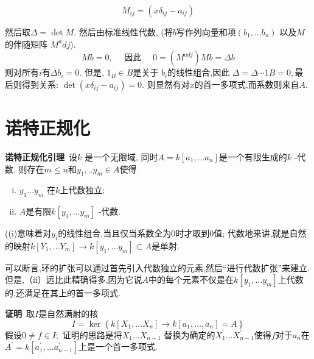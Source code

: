 \documentclass[UTF8]{book}
\begin{document}
		\begin{equation*}
		M _{ i j }=\left(x \delta_{ i j }- a _{ i j }\right)
		\end{equation*}
		
		然后取$\Delta=\operatorname{det} M .$ 然后由标准线性代数, (将$b$写作列向量和项$\left(b_{1}, \dots b_{n}\right)$ 以及$M$的伴随矩阵 $M^adj$).
		\begin{equation*}
		Mb =0, \quad \text { 因此 } \quad 0=\left(M ^{ adj }\right) Mb =\Delta b
		\end{equation*}
		则对所有$ i $有$\Delta b_{i}=0$. 但是, $1_{B} \in B$是关于 $b _{ i }$的线性组合,因此 $\Delta=\Delta \cdots 1 B =0,$最后则得到关系: $\operatorname{det}\left(x \delta_{ ij }- a _{ ij }\right)=0 .$ 则显然有对$x$的首一多项式,而系数则来自$ A $.
		
		
	\section{诺特正规化}
		\textbf{诺特正规化引理}\ 设$k$ 是一个无限域, 同时$A=k\left[a_{1}, \ldots a_{n}\right]$是一个有限生成的$k$ -代数. 则存在$m \leq n$和$y_{1}, . . y_{m} \in A$使得
		\begin{enumerate}[(i)]
			\item  $y _{1} \ldots y _{ m }$ 在$k$上代数独立;
			\item $A$是有限$k \left[ y _{1}, \dots y _{ m }\right]$ -代数.
		\end{enumerate}
		
		
		((i)意味着对$y_{i}$的线性组合,当且仅当系数全为0时才取到0值; 代数地来讲,就是自然的映射$k \left[ Y _{1}, \ldots Y _{ m }\right] \rightarrow k \left[ y _{1}, \ldots y _{ m }\right] \subset A$是单射.
		
		可以断言,环的扩张可以通过首先引入代数独立的元素,然后“进行代数扩张”来建立.但是,（ii）远比此精确得多,因为它说$ A $中的每个元素不仅是在$ k \left [y _ {1},\ldots y _ {m} \right]$上代数的,还满足在其上的首一多项式.
		
		
		
		\textbf{证明}\ 取$ I $是自然满射的核
		\begin{equation*}
		I =\operatorname{ker}\left\{ k \left[ X _{1}, \ldots X _{ n }\right] \rightarrow k \left[ a _{1}, \ldots, a _{n}\right]= A \right\}
		\end{equation*}
		假设$0 \neq f \in I ;$ 证明的思路是将$X _{1} \ldots X _{ n -1}$ 替换为确定的$X _{1}^{\prime} \ldots X _{ n -1}^{\prime}$使得$f$对于$a _{ n }$在$A ^{\prime}= k \left[ a _{1}^{\prime}, \ldots a ^{\prime}_{n -1}\right]$上是一个首一多项式.
		
\end{document}
